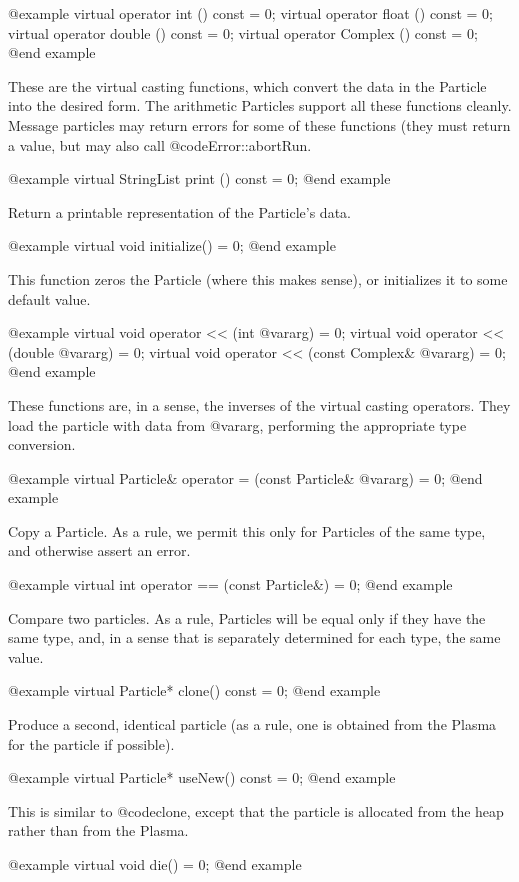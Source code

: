 @example
virtual operator int () const = 0;
virtual operator float () const = 0;
virtual operator double () const = 0;
virtual operator Complex () const = 0;
@end example

These are the virtual casting functions, which convert the data in
the Particle into the desired form.  The arithmetic Particles support
all these functions cleanly.  Message particles may return errors for
some of these functions (they must return a value, but may also call
@code{Error::abortRun}.

@example
virtual StringList print () const = 0;
@end example

Return a printable representation of the Particle's data.

@example
virtual void initialize() = 0;
@end example

This function zeros the Particle (where this makes sense), or
initializes it to some default value.

@example
virtual void operator << (int @var{arg}) = 0;
virtual void operator << (double @var{arg}) = 0;
virtual void operator << (const Complex& @var{arg}) = 0;
@end example

These functions are, in a sense, the inverses of the virtual casting
operators.  They load the particle with data from @var{arg}, performing
the appropriate type conversion.

@example
virtual Particle& operator = (const Particle& @var{arg}) = 0;
@end example

Copy a Particle.  As a rule, we permit this only for Particles of the
same type, and otherwise assert an error.

@example
virtual int operator == (const Particle&) = 0;
@end example

Compare two particles.  As a rule, Particles will be equal only if
they have the same type, and, in a sense that is separately determined
for each type, the same value.

@example
virtual Particle* clone() const = 0;
@end example

Produce a second, identical particle (as a rule, one is obtained from
the Plasma for the particle if possible).

@example
virtual Particle* useNew() const = 0;
@end example

This is similar to @code{clone}, except that the particle is allocated
from the heap rather than from the Plasma.

@example
virtual void die() = 0;
@end example

